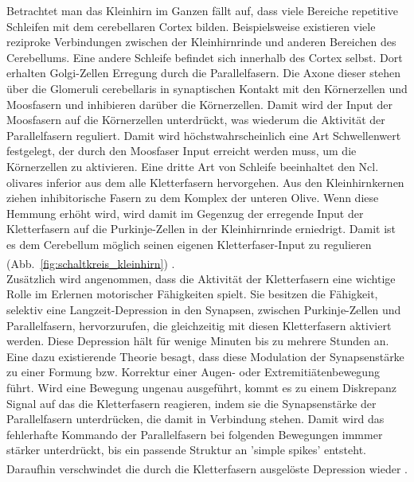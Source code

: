 \documentclass[12pt,a4paper,pdftex]{article}
\begin{document}
Betrachtet man das Kleinhirn im Ganzen fällt auf, dass viele Bereiche repetitive Schleifen mit dem cerebellaren Cortex bilden. Beispielsweise existieren viele reziproke Verbindungen zwischen der Kleinhirnrinde und anderen Bereichen des Cerebellums. Eine andere Schleife befindet sich innerhalb des Cortex selbst. Dort erhalten Golgi-Zellen Erregung durch die Parallelfasern. Die Axone dieser stehen über die Glomeruli cerebellaris in synaptischen Kontakt mit den Körnerzellen und Moosfasern und inhibieren darüber die Körnerzellen. Damit wird der Input der Moosfasern auf die Körnerzellen unterdrückt, was wiederum die Aktivität der Parallelfasern reguliert. Damit wird höchstwahrscheinlich eine Art Schwellenwert festgelegt, der durch den Moosfaser Input erreicht werden muss, um die Körnerzellen zu aktivieren. Eine dritte Art von Schleife beeinhaltet den Ncl. olivares inferior aus dem alle Kletterfasern hervorgehen. Aus den Kleinhirnkernen ziehen inhibitorische Fasern zu dem Komplex der unteren Olive. Wenn diese Hemmung erhöht wird, wird damit im Gegenzug der erregende Input der Kletterfasern auf die Purkinje-Zellen in der Kleinhirnrinde erniedrigt. Damit ist es dem Cerebellum möglich seinen eigenen Kletterfaser-Input zu regulieren (Abb.~\ref{fig:schaltkreis_kleinhirn}) \textsuperscript{\cite[42]{kandel2013principles}}.\\ 
Zusätzlich wird angenommen, dass die Aktivität der Kletterfasern eine wichtige Rolle im Erlernen motorischer Fähigkeiten spielt. Sie besitzen die Fähigkeit, selektiv eine Langzeit-Depression in den Synapsen, zwischen Purkinje-Zellen und Parallelfasern, hervorzurufen, die gleichzeitig mit diesen Kletterfasern aktiviert werden. Diese Depression hält für wenige Minuten bis zu mehrere Stunden an. Eine dazu existierende Theorie besagt, dass diese Modulation der Synapsenstärke zu einer Formung bzw. Korrektur einer Augen- oder  Extremitiätenbewegung führt. Wird eine Bewegung ungenau ausgeführt, kommt es zu einem Diskrepanz Signal auf das die Kletterfasern reagieren, indem sie die Synapsenstärke der Parallelfasern unterdrücken, die damit in Verbindung stehen. Damit wird das fehlerhafte Kommando der Parallelfasern bei folgenden Bewegungen immmer stärker unterdrückt, bis ein passende Struktur an 'simple spikes' entsteht. Daraufhin verschwindet die durch die Kletterfasern ausgelöste Depression wieder \textsuperscript{\cite[42]{kandel2013principles}}.   
\end{document}
